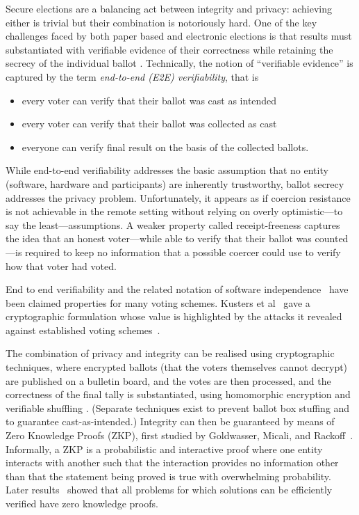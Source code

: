 \documentclass{llncs}
\begin{document}
Secure elections are a balancing act between integrity and privacy:
achieving either is trivial but their combination is notoriously hard.
One of the key challenges faced by both paper based and electronic
elections is that results must substantiated with
verifiable evidence of their correctness while retaining the secrecy
of the individual ballot \cite{Bernhard:2017:PES}.  Technically, the
notion of ``verifiable evidence'' is captured by the term 
\emph{end-to-end (E2E) verifiability}, that is
\begin{itemize}
  \item every voter can verify that their ballot was cast as
  intended
  \item every voter can verify that their ballot was collected as
  cast
  \item everyone can verify final result on the basis of the
  collected ballots.
\end{itemize}
While end-to-end verifiability addresses the basic assumption that
no entity (software, hardware and participants) are inherently
trustworthy, ballot secrecy addresses the privacy problem.
Unfortunately, it appears as if coercion resistance is not achievable  
in the remote setting without relying on overly optimistic---to say the least---assumptions.
A weaker property called receipt-freeness captures the idea that an honest 
voter---while able to verify that their ballot was counted---is required to keep 
no information that a possible coercer could use to verify how that voter had voted.

End to end verifiability and the related notation of software independence~\cite{Rivest:2008:PTRS}
 have been claimed properties for many voting schemes.  Kusters et al~\cite{Kusters:2010:CCS} gave
 a cryptographic formulation whose value is highlighted by the attacks it revealed against established voting 
 schemes~\cite{Kusters:2012:SP}.

The combination of privacy and integrity can be realised using cryptographic techniques, where
encrypted ballots (that the voters themselves cannot decrypt) are
published on a bulletin board, and the votes are then processed, and
the correctness of the final tally is substantiated, using
homomorphic encryption \cite{Hirt:2000:ERF} and verifiable shuffling
\cite{Bayer:2012:EZK}. (Separate techniques exist to prevent ballot
box stuffing and to guarantee cast-as-intended.)
Integrity can then be guaranteed by means of Zero Knowledge Proofs
(ZKP),
first studied by Goldwasser, Micali, and Rackoff~\cite{Goldwasser:1985:STOC}.
Informally, a ZKP is a probabilistic and interactive proof where one
entity interacts with another such that the interaction provides
no information other than that the statement being proved is true with
overwhelming probability. 
Later results~\cite{Goldreich:1991:ACM}\cite{Ben-Or:1988:CRYPTO} showed that 
all problems for which solutions can be efficiently verified have zero knowledge
proofs.
\end{document}
